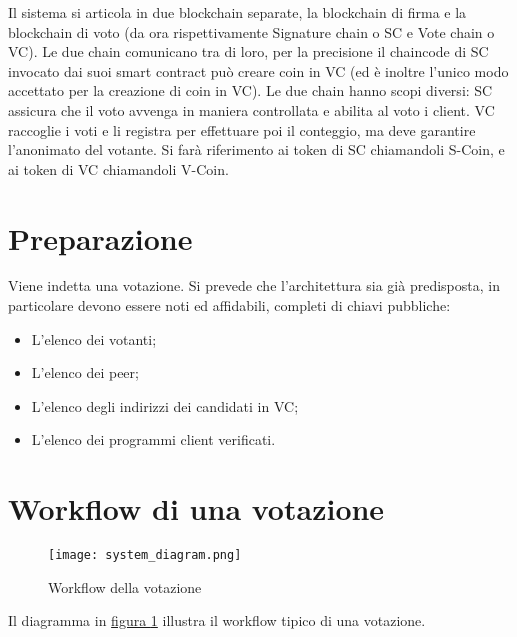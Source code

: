 Il sistema si articola in due blockchain separate, la blockchain di firma e la blockchain di voto (da ora rispettivamente Signature chain o SC e Vote chain o VC). Le due chain comunicano tra di loro, per la precisione il chaincode di SC invocato dai suoi smart contract può creare coin in VC (ed è inoltre l’unico modo accettato per la creazione di coin in VC).
Le due chain hanno scopi diversi: SC assicura che il voto avvenga in maniera controllata e abilita al voto i client. VC raccoglie i voti e li registra per effettuare poi il conteggio, ma deve garantire l’anonimato del votante.
Si farà riferimento ai token di SC chiamandoli S-Coin, e ai token di VC chiamandoli V-Coin.

\section{Preparazione}
		Viene indetta una votazione. Si prevede che l'architettura sia già predisposta, in particolare devono essere noti ed affidabili, completi di chiavi pubbliche:
		\begin{itemize}
			\item L'elenco dei votanti;
			\item L'elenco dei peer;
			\item L'elenco degli indirizzi dei candidati in VC;
			\item L'elenco dei programmi client verificati.
		\end{itemize}

\section{Workflow di una votazione}
	\begin{figure}[ht]
		\centering
		\texttt{[image: system\_diagram.png]}
		\caption{Workflow della votazione}
		\label{fig:voting_workflow}
	\end{figure}
	Il diagramma in \hyperref[fig:voting_workflow]{figura \ref*{fig:voting_workflow}} illustra il workflow tipico di una votazione.
